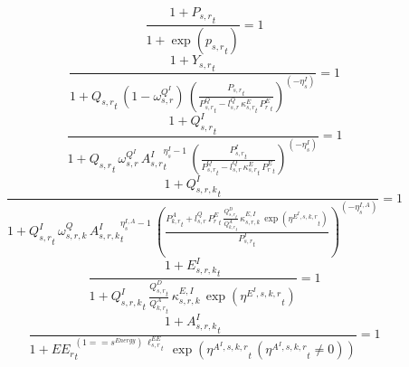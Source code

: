 \noindent[name= `regional subsector price level 2 1']
\begin{dmath}
\frac{1+{{P_{s,r}}}_{t}}{1+\exp\left({{p_{s,r}}}_{t}\right)}=1
\end{dmath}
\noindent[name= `demand for regional sector value added 2 1']
\begin{dmath}
\frac{1+{{Y_{s,r}}}_{t}}{1+{{Q_{s,r}}}_{t}\, \left(1-{{\omega^{Q^{I}}_{s,r}}}\right)\, \left(\frac{{{P_{s,r}}}_{t}}{{{P^Q_{s,r}}}_{t}-{{l^{Q}_{s,r}}}\, {{\kappa^{E}_{s,r}}}_{t}\, {{P^E_r}}_{t}}\right)^{\left(-{{\eta^{I}_{s}}}\right)}}=1
\end{dmath}
\noindent[name= `regional sector demand for intermediate composite 2 1']
\begin{dmath}
\frac{1+{{Q^{I}_{s,r}}}_{t}}{1+{{Q_{s,r}}}_{t}\, {{\omega^{Q^{I}}_{s,r}}}\, {{A^{I}_{s,r}}}_{t}^{{{\eta^{I}_{s}}}-1}\, \left(\frac{{{P^{I}_{s,r}}}_{t}}{{{P^Q_{s,r}}}_{t}-{{l^{Q}_{s,r}}}\, {{\kappa^{E}_{s,r}}}_{t}\, {{P^E_r}}_{t}}\right)^{\left(-{{\eta^{I}_{s}}}\right)}}=1
\end{dmath}
\noindent[name= `regional sector demand for intermediates from aggregate sector 2 1 1']
\begin{dmath}
\frac{1+{{Q^{I}_{s,r,k}}}_{t}}{1+{{Q^{I}_{s,r}}}_{t}\, {{\omega^{Q}_{s,r,k}}}\, {{A^{I}_{s,r,k}}}_{t}^{{{\eta^{I,A}_{s}}}-1}\, \left(\frac{{{P^{A}_{k,r}}}_{t}+{{l^{Q}_{s,r}}}\, {{P^E_r}}_{t}\, \frac{{{Q^{D}_{s,r}}}_{t}}{{{Q^{A}_{k,r}}}_{t}}\, {{\kappa^{E,I}_{s,r,k}}}\, \exp\left({{\eta^{E^{I},s,k,r}}}_{t}\right)}{{{P^{I}_{s,r}}}_{t}}\right)^{\left(-{{\eta^{I,A}_{s}}}\right)}}=1
\end{dmath}
\noindent[name= `regional emissions caused by using intermediates from aggregate sector 2 1 1']
\begin{dmath}
\frac{1+{{E^I_{s,r,k}}}_{t}}{1+{{Q^{I}_{s,r,k}}}_{t}\, \frac{{{Q^{D}_{s,r}}}_{t}}{{{Q^{A}_{k,r}}}_{t}}\, {{\kappa^{E,I}_{s,r,k}}}\, \exp\left({{\eta^{E^{I},s,k,r}}}_{t}\right)}=1
\end{dmath}
\noindent[name= `productivity of intermediates in subsector 2 region 1 from sector 1']
\begin{dmath}
\frac{1+{{A^{I}_{s,r,k}}}_{t}}{1+{{EE_r}}_{t}^{\left(1=={{s^{Energy}}}\right)\, {{\ell^{EE}_{s,r}}}_{t}}\, \exp\left({{\eta^{A^{I},s,k,r}}}_{t}\, \left({{\eta^{A^{I},s,k,r}}}_{t}\neq 0\right)\right)}=1
\end{dmath}
\noindent[name= `regional sector demand for intermediates from aggregate sector 2 1 2']
